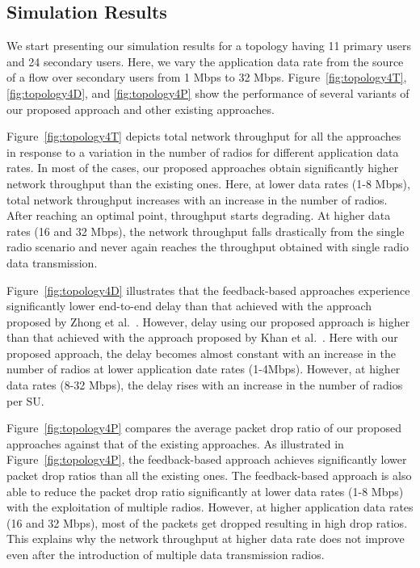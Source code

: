 \documentclass[letterpaper,conference]{IEEEtran}
\begin{document}
\subsection{Simulation Results}

We start presenting our simulation results for a topology having 11 primary users and 24 secondary users. Here, we vary the application data rate from the source of a flow over secondary users from 1 Mbps to 32 Mbps. Figure~\ref{fig:topology4T}, \ref{fig:topology4D}, and \ref{fig:topology4P} show the performance of several variants of our proposed approach and other existing approaches.


Figure~\ref{fig:topology4T} depicts total network throughput for all the approaches in response to a variation in the number of radios for different application data rates. In most of the cases, our proposed approaches obtain significantly higher network throughput than the existing ones. Here, at lower data rates (1-8 Mbps), total network throughput increases with an increase in the number of radios. After reaching an optimal point, throughput starts degrading. At higher data rates (16 and 32 Mbps), the network throughput falls drastically from the single radio scenario and never again reaches the throughput obtained with single radio data transmission.



Figure~\ref{fig:topology4D} illustrates that the feedback-based approaches experience significantly lower end-to-end delay than that achieved with the approach proposed by Zhong et al.~\cite{zhong2014capacity}. However, delay using our proposed approach is higher than that achieved with the approach proposed by Khan et al.~\cite{khan2015towards}. Here with our proposed approach, the delay becomes almost constant with an increase in the number of radios at lower application date rates (1-4Mbps). However, at higher data rates (8-32 Mbps), the delay rises with an increase in the number of radios per SU.



Figure~\ref{fig:topology4P} compares the average packet drop ratio of our proposed approaches against that of the existing approaches.  As illustrated in Figure~\ref{fig:topology4P}, the feedback-based approach achieves significantly lower packet drop ratios than all the existing ones. The feedback-based approach is also able to reduce the packet drop ratio significantly at lower data rates (1-8 Mbps) with the exploitation of multiple radios. However, at higher application data rates (16 and 32 Mbps), most of the packets get dropped resulting in high drop ratios. This explains why the network throughput at higher data rate does not improve even after the introduction of multiple data transmission radios.
\end{document}
